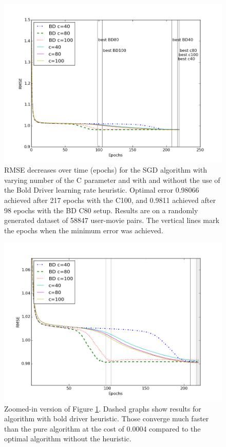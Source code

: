 \documentclass[10pt,conference,compsocconf]{IEEEtran}
\begin{document}
	
	\begin{figure}[tbp]
		\centering
		\includegraphics[width=\columnwidth]{convergence_speed_all.png}
		\caption{RMSE decreases over time (epochs) for the SGD algorithm with varying number of the C parameter and with and without the use of the Bold Driver learning rate heuristic. Optimal error 0.98066 achieved after 217 epochs with the C100, and 0.9811 achieved after 98 epochs with the BD C80 setup. Results are on a randomly generated dataset of 58847 user-movie pairs. The vertical lines mark the epochs when the minimum error was achieved.}
		\label{fig:sgd-conv}
	\end{figure}
	
	\begin{figure}[htbp]
		\centering
		\includegraphics[width=\columnwidth]{convergence_zoom_all.png}
		\caption{Zoomed-in version of Figure \ref{fig:sgd-conv}. Dashed graphs show results for algorithm with bold driver heuristic. Those converge much faster than the pure algorithm at the cost of 0.0004 compared to the optimal algorithm without the heuristic.}
		\label{fig:sgd-conv-zoom}
	\end{figure} 
	
\end{document}

